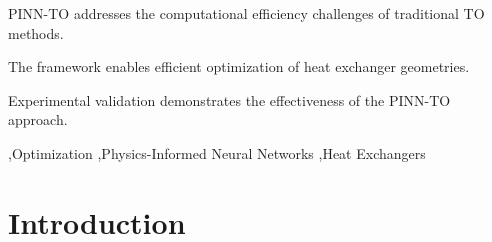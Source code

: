 \documentclass[a4paper,fleqn]{cas-dc}
\begin{document}
\begin{abstract}
Topology optimization (TO) of heat exchangers is a promising approach for enhancing thermal-hydraulic performance in various engineering applications. However, traditional TO methods often rely on computationally expensive physics solvers, limiting their practicality for complex designs and widespread application. This research proposes the integration of Physics-Informed Neural Networks (PINNs) with TO to create a novel framework for heat exchanger optimization. The PINN-TO framework will leverage the ability of PINNs to quickly approximate solutions to governing equations of fluid flow and heat transfer, enabling efficient evaluation and optimization of heat exchanger geometries. The objectives of this research include developing the PINN-TO framework, quantifying its performance against traditional TO methods, validating the optimized designs through experimental testing, and generalizing the framework across various heat exchanger configurations. The anticipated outcome is a computationally efficient and effective method for designing high-performance heat exchangers, contributing to advancements in customized heat transfer applications. \nocite{*}
\end{abstract}

\begin{highlights}
\item PINN-TO addresses the computational efficiency challenges of traditional TO methods.
\item The framework enables efficient optimization of heat exchanger geometries.
\item Experimental validation demonstrates the effectiveness of the PINN-TO approach.
\end{highlights}

\begin{keywords}
 \sep Optimization \sep Physics-Informed Neural Networks \sep Heat Exchangers
\end{keywords}

\maketitle

\section{Introduction}\label{sec:introduction}
\end{document}
